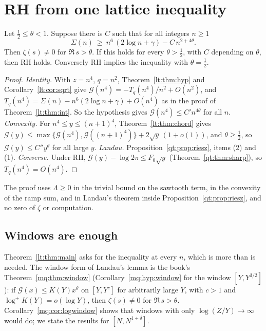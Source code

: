 \section{RH from one lattice inequality}\label{lt:sec:main}

\begin{theorem}\label{lt:thm:main}
Let $\tfrac12\le\theta<1$. Suppose there is $C$ such that for all integers $n\ge1$
\[
\Sigma(n)\ \ge\ n^6\,(2\log n+\gamma)-C\,n^{2+4\theta}.
\]
Then $\zeta(s)\ne0$ for $\Re\,s>\theta$. If this holds for every $\theta>\tfrac12$, with $C$ depending on $\theta$, then RH holds. Conversely RH implies the inequality with $\theta=\tfrac12$.
\end{theorem}

\begin{proof}
\emph{Identity.} With $z=n^4$, $q=n^2$, Theorem~\ref{lt:thm:hyp} and Corollary~\ref{lt:cor:sqrt} give $\mathcal G(n^4)=-T_q(n^4)/n^2+O(n^2)$, and $T_q(n^4)=\Sigma(n)-n^6(2\log n+\gamma)+O(n^4)$ as in the proof of Theorem~\ref{lt:thm:int}. So the hypothesis gives $\mathcal G(n^4)\le C'n^{4\theta}$ for all $n$. \emph{Convexity.} For $n^4\le y\le(n+1)^4$, Theorem~\ref{lt:thm:chord} gives $\mathcal G(y)\le\max\{\mathcal G(n^4),\mathcal G((n+1)^4)\}+2\sqrt y\,(1+o(1))$, and $\theta\ge\tfrac12$, so $\mathcal G(y)\le C''y^\theta$ for all large $y$. \emph{Landau.} Proposition~\ref{qt:prop:riesz}, items (2) and (1). \emph{Converse.} Under RH, $\mathcal G(y)-\log2\pi\le F_0\sqrt y$ (Theorem~\ref{qt:thm:sharp}), so $T_q(n^4)=O(n^4)$.
\end{proof}

The proof uses $\Lambda\ge0$ in the trivial bound on the sawtooth term, in the convexity of the ramp sum, and in Landau's theorem inside Proposition~\ref{qt:prop:riesz}, and no zero of $\zeta$ or computation.

\subsection*{Windows are enough}
Theorem~\ref{lt:thm:main} asks for the inequality at every $n$, which is more than is needed. The window form of Landau's lemma is the book's Theorem~\ref{mq:thm:window} (Corollary~\ref{mq:hyp:window} for the window $[Y,Y^{3/2}]$): if $\mathcal G(x)\le K(Y)x^\theta$ on $[Y,Y^{c}]$ for arbitrarily large $Y$, with $c>1$ and $\log^+K(Y)=o(\log Y)$, then $\zeta(s)\ne0$ for $\Re\,s>\theta$. Corollary~\ref{mq:cor:logwindow} shows that windows with only $\log(Z/Y)\to\infty$ would do; we state the results for $[N,N^{1+\delta}]$.

